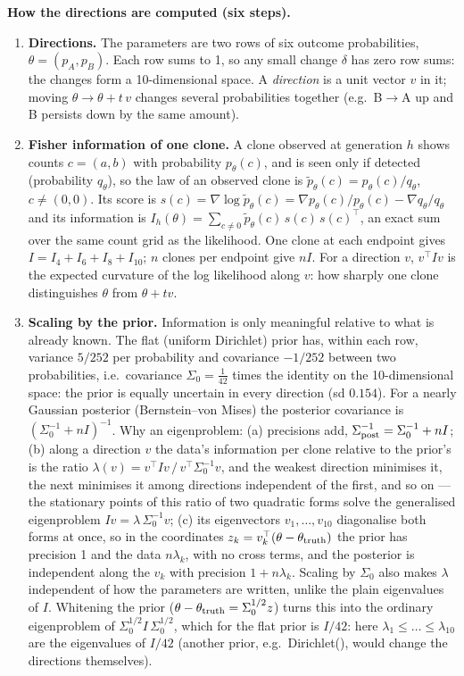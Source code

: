 \documentclass[10pt,a4paper]{article}
\newcommand{\BA}{B$\to$A}
\begin{document}
\begin{keybox}
\textbf{How the directions are computed (six steps).}
\begin{enumerate}
\item \textbf{Directions.} The parameters are two rows of six outcome probabilities, $\theta = (p_A, p_B)$. Each row sums to 1, so any small change $\delta$ has zero row sums: the changes form a 10-dimensional space. A \emph{direction} is a unit vector $v$ in it; moving $\theta \to \theta + t\,v$ changes several probabilities together (e.g.\ \BA{} up and B persists down by the same amount).
\item \textbf{Fisher information of one clone.} A clone observed at generation $h$ shows counts $c = (a, b)$ with probability $p_\theta(c)$, and is seen only if detected (probability $q_\theta$), so the law of an observed clone is $\tilde p_\theta(c) = p_\theta(c)/q_\theta$, $c \ne (0,0)$. Its score is $s(c) = \nabla \log \tilde p_\theta(c) = \nabla p_\theta(c)/p_\theta(c) - \nabla q_\theta/q_\theta$ and its information is $I_h(\theta) = \sum_{c \ne 0} \tilde p_\theta(c)\, s(c)\, s(c)^{\!\top}$, an exact sum over the same count grid as the likelihood. One clone at each endpoint gives $I = I_4 + I_6 + I_8 + I_{10}$; $n$ clones per endpoint give $n I$. For a direction $v$, $v^\top I v$ is the expected curvature of the log likelihood along $v$: how sharply one clone distinguishes $\theta$ from $\theta + t v$.
\item \textbf{Scaling by the prior.} Information is only meaningful relative to what is already known. The flat (uniform Dirichlet) prior has, within each row, variance $5/252$ per probability and covariance $-1/252$ between two probabilities, i.e.\ covariance $\Sigma_0 = \tfrac{1}{42}$ times the identity on the 10-dimensional space: the prior is equally uncertain in every direction (sd $0.154$). For a nearly Gaussian posterior (Bernstein--von Mises) the posterior covariance is $(\Sigma_0^{-1} + n I)^{-1}$. Why an eigenproblem: (a) precisions add, $\Sigma_{\rm post}^{-1} = \Sigma_0^{-1} + nI$; (b) along a direction $v$ the data's information per clone relative to the prior's is the ratio $\lambda(v) = v^\top I v \,/\, v^\top \Sigma_0^{-1} v$, and the weakest direction minimises it, the next minimises it among directions independent of the first, and so on --- the stationary points of this ratio of two quadratic forms solve the generalised eigenproblem $I v = \lambda\, \Sigma_0^{-1} v$; (c) its eigenvectors $v_1, \dots, v_{10}$ diagonalise both forms at once, so in the coordinates $z_k = v_k^\top(\theta - \theta_{\rm truth})$ the prior has precision 1 and the data $n\lambda_k$, with no cross terms, and the posterior is independent along the $v_k$ with precision $1 + n\lambda_k$. Scaling by $\Sigma_0$ also makes $\lambda$ independent of how the parameters are written, unlike the plain eigenvalues of $I$. Whitening the prior ($\theta - \theta_{\rm truth} = \Sigma_0^{1/2} z$) turns this into the ordinary eigenproblem of $\Sigma_0^{1/2} I\, \Sigma_0^{1/2}$, which for the flat prior is $I/42$: here $\lambda_1 \le \dots \le \lambda_{10}$ are the eigenvalues of $I/42$ (another prior, e.g.\ Dirichlet(\textonehalf), would change the directions themselves).

\end{enumerate}
\end{keybox}
\end{document}
